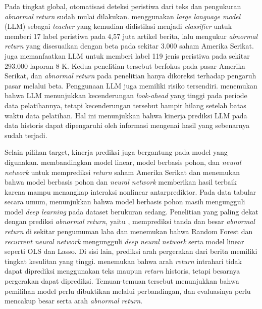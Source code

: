 Pada tingkat global, otomatisasi deteksi peristiwa dari teks dan pengukuran \emph{abnormal return} sudah mulai dilakukan. \textcite{kargarzadeh2026} menggunakan \emph{large language model} (LLM) sebagai \emph{teacher} yang kemudian didistilasi menjadi \emph{classifier} untuk memberi 17 label peristiwa pada 4,57 juta artikel berita, lalu mengukur \emph{abnormal return} yang disesuaikan dengan beta pada sekitar 3.000 saham Amerika Serikat. \textcite{dolphin2026} juga memanfaatkan LLM untuk memberi label 119 jenis peristiwa pada sekitar 293.000 laporan 8-K. Kedua penelitian tersebut berfokus pada pasar Amerika Serikat, dan \emph{abnormal return} pada penelitian \textcite{kargarzadeh2026} hanya dikoreksi terhadap pengaruh pasar melalui beta. Penggunaan LLM juga memiliki risiko tersendiri. \textcite{gao2025} menemukan bahwa LLM menunjukkan kecenderungan \emph{look-ahead} yang tinggi pada periode data pelatihannya, tetapi kecenderungan tersebut hampir hilang setelah batas waktu data pelatihan. Hal ini menunjukkan bahwa kinerja prediksi LLM pada data historis dapat dipengaruhi oleh informasi mengenai hasil yang sebenarnya sudah terjadi.

Selain pilihan target, kinerja prediksi juga bergantung pada model yang digunakan. \textcite{gu2020} membandingkan model linear, model berbasis pohon, dan \emph{neural network} untuk memprediksi \emph{return} saham Amerika Serikat dan menemukan bahwa model berbasis pohon dan \emph{neural network} memberikan hasil terbaik karena mampu menangkap interaksi nonlinear antarprediktor. Pada data tabular secara umum, \textcite{grinsztajn2022} menunjukkan bahwa model berbasis pohon masih mengungguli model \emph{deep learning} pada dataset berukuran sedang. Penelitian yang paling dekat dengan prediksi \emph{abnormal return}, yaitu \textcite{amelzadeh2020}, memprediksi tanda dan besar \emph{abnormal return} di sekitar pengumuman laba dan menemukan bahwa Random Forest dan \emph{recurrent neural network} mengungguli \emph{deep neural network} serta model linear seperti OLS dan Lasso. Di sisi lain, prediksi arah pergerakan dari berita memiliki tingkat kesulitan yang tinggi. \textcite{luss2015} menemukan bahwa arah \emph{return} intrahari tidak dapat diprediksi menggunakan teks maupun \emph{return} historis, tetapi besarnya pergerakan dapat diprediksi. Temuan-temuan tersebut menunjukkan bahwa pemilihan model perlu dibuktikan melalui perbandingan, dan evaluasinya perlu mencakup besar serta arah \emph{abnormal return}.

